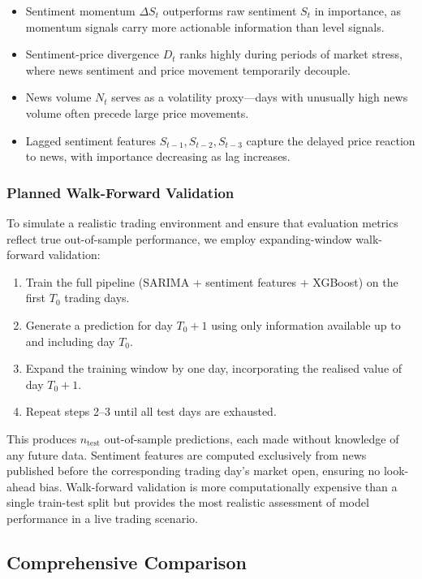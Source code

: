 \begin{itemize}
    \item Sentiment momentum $\Delta S_t$ outperforms raw sentiment $S_t$ in importance, as momentum signals carry more actionable information than level signals.
    \item Sentiment-price divergence $D_t$ ranks highly during periods of market stress, where news sentiment and price movement temporarily decouple.
    \item News volume $N_t$ serves as a volatility proxy---days with unusually high news volume often precede large price movements.
    \item Lagged sentiment features $S_{t-1}, S_{t-2}, S_{t-3}$ capture the delayed price reaction to news, with importance decreasing as lag increases.
\end{itemize}

\subsubsection{Planned Walk-Forward Validation}

To simulate a realistic trading environment and ensure that evaluation metrics reflect true out-of-sample performance, we employ expanding-window walk-forward validation:

\begin{enumerate}
    \item Train the full pipeline (SARIMA + sentiment features + XGBoost) on the first $T_0$ trading days.
    \item Generate a prediction for day $T_0 + 1$ using only information available up to and including day $T_0$.
    \item Expand the training window by one day, incorporating the realised value of day $T_0 + 1$.
    \item Repeat steps 2--3 until all test days are exhausted.
\end{enumerate}

This produces $n_{\text{test}}$ out-of-sample predictions, each made without knowledge of any future data. Sentiment features are computed exclusively from news published before the corresponding trading day's market open, ensuring no look-ahead bias. Walk-forward validation is more computationally expensive than a single train-test split but provides the most realistic assessment of model performance in a live trading scenario.


\subsection{Comprehensive Comparison}


